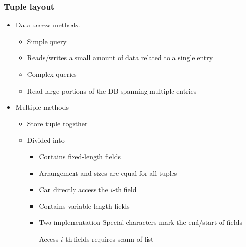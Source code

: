 \subsubsection{Tuple layout}
\begin{itemize}
    \item Data access methods:
            \begin{itemize}
                \item Simple query
                \item Reads/writes a small amount of data related to a single entry
            \end{itemize}
            \begin{itemize}
                \item Complex queries
                \item Read large portions of the DB spanning multiple entries
            \end{itemize}
        \item Multiple methods
        \begin{itemize}
            \item Store tuple together
            \item Divided into
                \begin{itemize}
                     
                        \begin{itemize}
                            \item Contains fixed-length fields
                            \item Arrangement and sizes are equal for all tuples
                            \item Can directly access the $i$-th field
                        \end{itemize}
                        \begin{itemize}
                            \item Contains variable-length fields
                            \item Two implementation
                             Special characters mark the end/start of fields
                                \begin{itemize}
                                    \icon Access $i$-th fields requires scann of list

\end{itemize}
\end{itemize}
\end{itemize}
\end{itemize}
\end{itemize}
